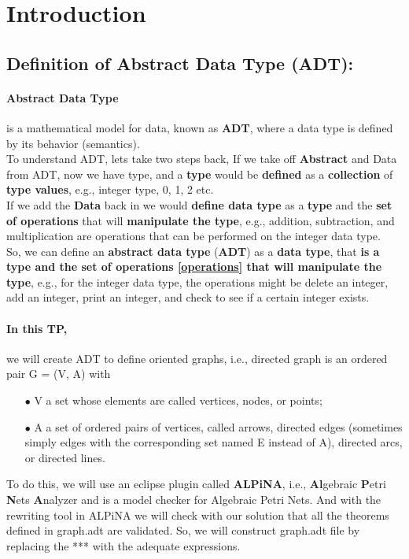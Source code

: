 \documentclass[a4paper,11pt,final]{article}
\begin{document}

\section{Introduction}

\subsection{Definition of Abstract Data Type (ADT):}

\paragraph{Abstract Data Type}is a mathematical model for data, known as \textbf{ADT}, where a data type is defined by its behavior (semantics).\\
To understand ADT, lets take two steps back, If we take off \textbf{Abstract} and Data from ADT, now we have type, and a \textbf{type} would be \textbf{defined} as a \textbf{collection} of \textbf{type values}, e.g., integer type, 0, 1, 2 etc.\\
If we add the \textbf{Data} back in we would \textbf{define data type} as  a \textbf{type} and the \textbf{set of operations} that will \textbf{manipulate the type}, e.g., addition, subtraction, and multiplication are operations that can be performed on the integer data type.\\
So, we can define an \textbf{abstract data type} (\textbf{ADT}) as a \textbf{data type}, that \textbf{is a type and the set of operations\label{operationsapp} \ref{operations} that will manipulate the type}, e.g., for the integer data type, the operations might be delete an integer, add an integer, print an integer, and check to see if a certain integer exists.\paragraph{In this TP,}we will create ADT to define oriented graphs, i.e., directed graph is an ordered pair G = (V, A) with
\begin{itemize}
\item[$\bullet$] V a set whose elements are called vertices, nodes\label{node}, or points;
\item[$\bullet$] A a set of ordered pairs of vertices, called arrows, directed edges (sometimes simply edges with the corresponding set named E instead of A), directed arcs, or directed lines.
\end{itemize} To do this, we will use an eclipse plugin called \textbf{ALPiNA}, i.e., \textbf{Al}gebraic \textbf{P}etri \textbf{N}ets \textbf{A}nalyzer and is a model checker for Algebraic Petri Nets. And with the rewriting tool in ALPiNA we will check with our solution that all the theorems defined in \textcolor{colour3}{graph.adt} are validated.
So, we will construct \textcolor{colour3}{graph.adt} file by replacing the *** with the adequate expressions.
\end{document}
